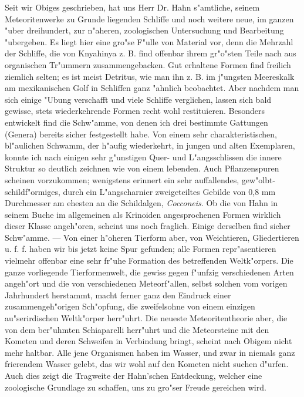 \documentclass[a4paper, 12pt, oneside]{article}
\begin{document}
Seit wir Obiges geschrieben, hat uns Herr Dr. Hahn s"amtliche, seinem Meteoritenwerke zu Grunde liegenden Schliffe und noch weitere neue, im ganzen "uber dreihundert, zur n"aheren, zoologischen Untersuchung und Bearbeitung "ubergeben. Es liegt hier eine gro"se F"ulle von Material vor, denn die Mehrzahl der Schliffe, die von Knyahinya z. B. find offenbar ihrem gr"o"sten Teile nach aus organischen Tr"ummern zusammengebacken. Gut erhaltene Formen find freilich ziemlich selten; es ist meist Detritus, wie man ihn z. B. im j"ungsten Meereskalk am mexikanischen Golf in Schliffen ganz "ahnlich beobachtet. Aber nachdem man sich einige "Ubung verschafft und viele Schliffe verglichen, lassen sich bald gewisse, stets wiederkehrende Formen recht wohl restituieren. Besonders entwickelt find die Schw"amme, von denen ich drei bestimmte Gattungen (Genera) bereits sicher festgestellt habe. Von einem sehr charakteristischen, bl"aulichen Schwamm, der h"aufig wiederkehrt, in jungen und alten Exemplaren, konnte ich nach einigen sehr g"unstigen Quer- und L"angsschlissen die innere Struktur so deutlich zeichnen wie von einem lebenden. Auch Pflanzenspuren scheinen vorzukommen; wenigstens erinnert ein sehr auffallendes, gew"olbt-schildf"ormiges, durch ein L"angscharnier zweigeteiltes Gebilde von 0,8 mm Durchmesser am ehesten an die Schildalgen, \emph{Cocconeis}. Ob die von Hahn in seinem Buche im allgemeinen als Krinoiden angesprochenen Formen wirklich dieser Klasse angeh"oren, scheint uns noch fraglich. Einige derselben find sicher Schw"amme. — Von einer h"oheren Tierform aber, von Weichtieren, Gliedertieren u. f. f. haben wir bis jetzt keine Spur gefunden; alle Formen repr"asentieren vielmehr offenbar eine sehr fr"uhe Formation des betreffenden Weltk"orpers. Die ganze vorliegende Tierformenwelt, die gewiss gegen f"unfzig verschiedenen Arten angeh"ort und die von verschiedenen Meteorf"allen, selbst solchen vom vorigen Jahrhundert herstammt, macht ferner ganz den Eindruck einer zusammengeh"origen Sch"opfung, die zweifelsohne von einem einzigen au"serirdischen Weltk"orper herr"uhrt. Die neueste Meteoritentheorie aber, die von dem ber"uhmten Schiaparelli herr"uhrt und die Meteorsteine mit den Kometen und deren Schweifen in Verbindung bringt, scheint nach Obigem nicht mehr haltbar. Alle jene Organismen haben im Wasser, und zwar in niemals ganz frierendem Wasser gelebt, das wir wohl auf den Kometen nicht suchen d"urfen. Auch dies zeigt die Tragweite der Hahn'schen Entdeckung, welcher eine zoologische Grundlage zu schaffen, uns zu gro"ser Freude gereichen wird.
\end{document}
